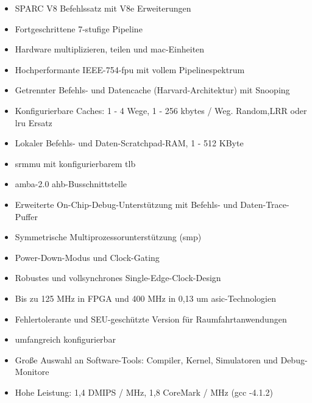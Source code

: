\begin{itemize}
  \item SPARC V8 Befehlssatz mit V8e Erweiterungen
\item Fortgeschrittene 7-stufige Pipeline
\item Hardware multiplizieren, teilen und \ac{mac}-Einheiten
\item Hochperformante IEEE-754-\ac{fpu} mit vollem Pipelinespektrum
\item Getrennter Befehls- und Datencache (Harvard-Architektur) mit Snooping
\item Konfigurierbare Caches: 1 - 4 Wege, 1 - 256 kbytes / Weg. Random,LRR oder \ac{lru} Ersatz
\item Lokaler Befehls- und Daten-Scratchpad-RAM, 1 - 512 KByte
\item \ac{srmmu} mit konfigurierbarem \ac{tlb}
\item \ac{amba}-2.0 \ac{ahb}-Busschnittstelle
\item Erweiterte On-Chip-Debug-Unterstützung mit Befehls- und Daten-Trace-Puffer
\item Symmetrische Multiprozessorunterstützung (\ac{smp})
\item Power-Down-Modus und Clock-Gating
\item Robustes und vollsynchrones Single-Edge-Clock-Design
\item Bis zu 125 MHz in FPGA und 400 MHz in 0,13 um \ac{asic}-Technologien
\item Fehlertolerante und SEU-geschützte Version für Raumfahrtanwendungen
\item umfangreich konfigurierbar
\item Große Auswahl an Software-Tools: Compiler, Kernel, Simulatoren und Debug-Monitore
\item Hohe Leistung: 1,4 DMIPS / MHz, 1,8 CoreMark / MHz (gcc -4.1.2)
\end{itemize}
